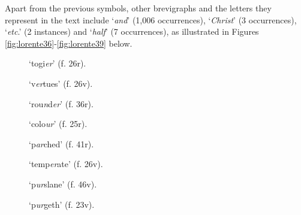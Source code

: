 \begin{paper}
Apart from the previous symbols, other brevigraphs and the letters they
represent in the text include `\emph{and}' (1,006 occurrences),
`\emph{Christ}' (3 occurrences), `\emph{etc}.' (2 instances) and
`\emph{half}' (7 occurrences), as illustrated in Figures \ref{fig:lorente36}-\ref{fig:lorente39} below.

\begin{figure}[H]
  \centering
  \begin{minipage}[b]{0.36\textwidth}
    \caption{`togi\th\emph{er}' (f. 26r).}
    \label{fig:lorente21}
  \end{minipage}
  \hfill
  \begin{minipage}[b]{0.36\textwidth}
    \caption{`v\emph{er}tues' (f.
26v).}
    \label{fig:lorente22}
  \end{minipage}
\end{figure}

\begin{figure}[H]
  \centering
  \begin{minipage}[b]{0.36\textwidth}
    \caption{`rou\emph{n}d\emph{er}' (f. 36r).}
    \label{fig:lorente23}
  \end{minipage}
  \hfill
  \begin{minipage}[b]{0.36\textwidth}
    \caption{`colo\emph{ur}' (f. 25r).}
    \label{fig:lorente24}
  \end{minipage}
\end{figure}

\begin{figure}[H]
  \centering
  \begin{minipage}[b]{0.36\textwidth}
    \caption{`p\emph{ar}ched' (f. 41r).\\}
    \label{fig:lorente25}
  \end{minipage}
  \hfill
  \begin{minipage}[b]{0.36\textwidth}
    \caption{`temp\emph{er}ate' (f.
26v).\\}
    \label{fig:lorente26}
  \end{minipage}
\hfill
  \begin{minipage}[b]{0.36\textwidth}
    \caption{`p\emph{ur}slane' (f. 46v).}
    \label{fig:lorente27}
  \end{minipage}
  \hfill
  \begin{minipage}[b]{0.36\textwidth}
    \caption{`p\emph{ur}geth' (f.
23v).}
    \label{fig:lorente28}
  \end{minipage}
\end{figure}


\end{paper}
